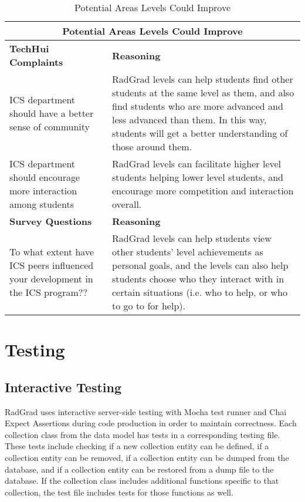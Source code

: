 \begin{table}[htbp!]
\centering
\begin{tabular}{  |p{4cm}|p{12cm}| } 
\hline
 \multicolumn{2}{|c|}{Potential Areas Levels Could Improve}\\
  \hline
 \textbf{TechHui Complaints} & \textbf{Reasoning} \\ 
  \hline
  ICS department should have a better sense of community & RadGrad levels can help students find other students at the same level as them, and also find students who are more advanced and less advanced than them. In this way, students will get a better understanding of those around them.\\
    \hline
  ICS department should encourage more interaction among students & RadGrad levels can facilitate higher level students helping lower level students, and encourage more competition and interaction overall. \\
  \hline
 \textbf{Survey Questions} & \textbf{Reasoning} \\ 
  \hline
   To what extent have ICS peers influenced your development in the ICS program?? & RadGrad levels can help students view other students' level achievements as personal goals, and the levels can also help students choose who they interact with in certain situations (i.e. who to help, or who to go to for help).\\
  \hline
\end{tabular}
 \caption{Potential Areas Levels Could Improve}
\end{table}



\section{Testing}
\subsection{Interactive Testing}

RadGrad uses interactive server-side testing with Mocha test runner and Chai Expect Assertions during code production in order to maintain correctness. Each collection class from the data model has tests in a corresponding testing file. These tests include checking if a new collection entity can be defined, if a collection entity can be removed, if a collection entity can be dumped from the database, and if a collection entity can be restored from a dump file to the database. If the collection class includes additional functions specific to that collection, the test file includes tests for those functions as well.

